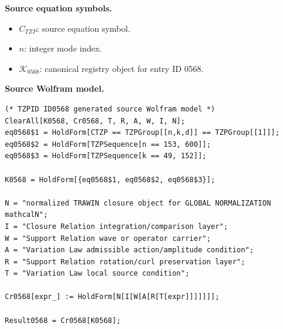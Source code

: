 \begin{minipage}[t]{0.49\linewidth}
\begingroup
\small
\raggedright
\textbf{Source equation symbols.}\par
\begin{itemize}[leftmargin=1.35em,itemsep=1pt,topsep=1pt,parsep=0pt]
    \item $C_{TZP}$: source equation symbol.
    \item $n$: integer mode index.
    \item $\mathcal{K}_{0568}$: canonical registry object for entry ID 0568.
\end{itemize}
\endgroup
\end{minipage}\hfill
\begin{minipage}[t]{0.47\linewidth}
\begingroup
\scriptsize
\raggedright
\textbf{Source Wolfram model.}\par
\begin{Verbatim}[fontsize=\tiny,breaklines=true,breakanywhere=true]
(* TZPID ID0568 generated source Wolfram model *)
ClearAll[K0568, Cr0568, T, R, A, W, I, N];
eq0568$1 = HoldForm[CTZP == TZPGroup[[n,k,d]] == TZPGroup[[1]]];
eq0568$2 = HoldForm[TZPSequence[n == 153, 600]];
eq0568$3 = HoldForm[TZPSequence[k == 49, 152]];

K0568 = HoldForm[{eq0568$1, eq0568$2, eq0568$3}];

N = "normalized TRAWIN closure object for GLOBAL NORMALIZATION mathcalN";
I = "Closure Relation integration/comparison layer";
W = "Support Relation wave or operator carrier";
A = "Variation Law admissible action/amplitude condition";
R = "Support Relation rotation/curl preservation layer";
T = "Variation Law local source condition";

Cr0568[expr_] := HoldForm[N[I[W[A[R[T[expr]]]]]]];

Result0568 = Cr0568[K0568];
\end{Verbatim}
\endgroup
\end{minipage}

